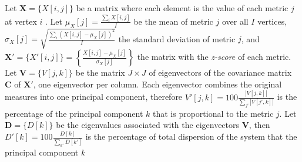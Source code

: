 \documentclass[%
	aip,
	jmp,%
	amsmath,amssymb,
	reprint,%
]{revtex4-1}
\begin{document}
																																																																																Let $\mathbf{X}=\{X[i,j]\}$ be a matrix where each element is the value
																																																																																of each metric $j$ at vertex $i$ .
																																																																																Let
																																																																																$\mu_X [j]=\frac{\sum_i X[i,j]}{I}$ be the mean of metric $j$ over all $I$ vertices, 
																																																																																$\sigma_X [j]=\sqrt{\frac{\sum_i (X[i,j]-\mu_X [j])^2}{I}}$ the standard deviation of metric $j$,
																																																																																and $\mathbf{X'}=\{X'[i,j]\}=\left\{\frac{X[i,j]-\mu_X[j]}{\sigma_X[j]}\right\}$ 
																																																																																the matrix with the \emph{z-score} of each metric. 
																																																																																Let $\mathbf{V}=\{V[j,k]\}$ be the matrix $J\times J$ of eigenvectors
																																																																																of the covariance matrix $\mathbf{C}$
																																																																																of $\mathbf{X'}$, one eigenvector per column.
																																																																																Each eigenvector combines the original measures into one principal component, therefore
																																																																																$V'[j,k]=100\frac{|V[j,k]|}{\sum_{j'} |V[j',k]|}$
																																																																																is the percentage of the principal component $k$
																																																																																that is proportional to the metric $j$.
																																																																																Let $\mathbf{D}=\{D[k]\}$ be the eigenvalues associated with the eigenvectors $\mathbf{V}$,
																																																																																then $D'[k]=100\frac{D[k]}{\sum_{k'}D[k']}$
																																																																																is the percentage of total dispersion of the system that the principal component $k$
\end{document}
